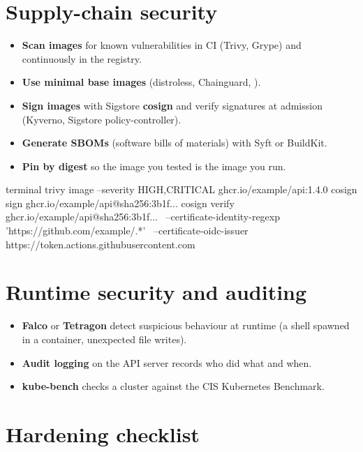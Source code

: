 \section{Supply-chain security}

\begin{itemize}
  \item \textbf{Scan images} for known vulnerabilities in CI (Trivy, Grype)
        and continuously in the registry.
  \item \textbf{Use minimal base images} (distroless, Chainguard, ).
  \item \textbf{Sign images} with Sigstore \textbf{cosign} and verify signatures
        at admission (Kyverno, Sigstore policy-controller).
  \item \textbf{Generate SBOMs} (software bills of materials) with Syft or BuildKit.
  \item \textbf{Pin by digest} so the image you tested is the image you run.
\end{itemize}

\begin{bashcode}{terminal}
trivy image --severity HIGH,CRITICAL ghcr.io/example/api:1.4.0
cosign sign ghcr.io/example/api@sha256:3b1f...
cosign verify ghcr.io/example/api@sha256:3b1f... \
  --certificate-identity-regexp 'https://github.com/example/.*' \
  --certificate-oidc-issuer https://token.actions.githubusercontent.com
\end{bashcode}

\section{Runtime security and auditing}

\begin{itemize}
  \item \textbf{Falco} or \textbf{Tetragon} detect suspicious behaviour at
        runtime (a shell spawned in a container, unexpected file writes).
  \item \textbf{Audit logging} on the API server records who did what and when.
  \item \textbf{kube-bench} checks a cluster against the CIS Kubernetes Benchmark.
\end{itemize}

\section{Hardening checklist}


